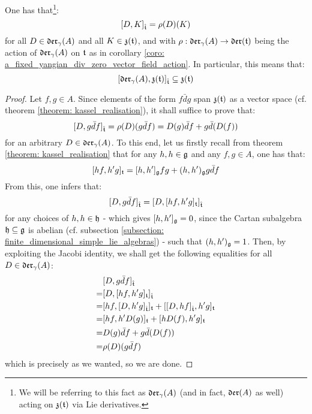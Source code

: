         \begin{lemma} \label{lemma: derivation_action_on_toroidal_centres}
            One has that\footnote{We will be referring to this fact as $\mathfrak{der}_{\gamma}(A)$ (and in fact, $\mathfrak{der}(A)$ as well) acting on $\mathfrak{z}(\mathfrak{t})$ via Lie derivatives.}:
                $$[D, K]_{\hat{\mathfrak{t}}} = \rho(D)(K)$$
            for all $D \in \mathfrak{der}_{\gamma}(A)$ and all $K \in \mathfrak{z}(\mathfrak{t})$, and with $\rho: \mathfrak{der}_{\gamma}(A) \to \mathfrak{der}(\mathfrak{t})$ being the action of $\mathfrak{der}_{\gamma}(A)$ on $\mathfrak{t}$ as in corollary \ref{coro: a_fixed_yangian_div_zero_vector_field_action}. In particular, this means that:
                $$[\mathfrak{der}_{\gamma}(A), \mathfrak{z}(\mathfrak{t})]_{\hat{\mathfrak{t}}} \subseteq \mathfrak{z}(\mathfrak{t})$$
        \end{lemma}
            \begin{proof}
                Let $f, g \in A$. Since elements of the form $f \bar{d}g$ span $\mathfrak{z}(\mathfrak{t})$ as a vector space (cf. theorem \ref{theorem: kassel_realisation}), it shall suffice to prove that:
                    $$[D, g \bar{d}f]_{\hat{\mathfrak{t}}} = \rho(D)( g\bar{d}f ) = D(g) \bar{d}f + g \bar{d}(D(f))$$
                for an arbitrary $D \in \mathfrak{der}_{\gamma}(A)$. To this end, let us firstly recall from theorem \ref{theorem: kassel_realisation} that for any $h, h \in \mathfrak{g}$ and any $f, g \in A$, one has that:
                    $$[h f, h' g]_{\mathfrak{t}} = [h, h']_{\mathfrak{g}} fg + (h, h')_{\mathfrak{g}} g \bar{d}f$$
                From this, one infers that:
                    $$[D, g \bar{d}f]_{\hat{\mathfrak{t}}} = [ D, [hf, h' g]_{\mathfrak{t}} ]_{\hat{\mathfrak{t}}}$$
                for any choices of $h, h \in \mathfrak{h}$ - which gives $[h, h']_{\mathfrak{g}} = 0$, since the Cartan subalgebra $\mathfrak{h} \subseteq \mathfrak{g}$ is abelian (cf. subsection \ref{subsection: finite_dimensional_simple_lie_algebras}) - such that $(h, h')_{\mathfrak{g}} = 1$. Then, by exploiting the Jacobi identity, we shall get the following equalities for all $D \in \mathfrak{der}_{\gamma}(A)$:
                    $$
                        \begin{aligned}
                            & [D, g \bar{d}f]_{\hat{\mathfrak{t}}}
                            \\
                            = & [ D, [h f, h' g]_{\mathfrak{t}} ]_{\hat{\mathfrak{t}}}
                            \\
                            = & [ h f, [D, h' g]_{\hat{\mathfrak{t}}} ]_{\mathfrak{t}} + [ [D, h f]_{\hat{\mathfrak{t}}}, h' g ]_{\mathfrak{t}}
                            \\
                            = & [ h f, h' D( g ) ]_{\mathfrak{t}} + [ h D( f ), h' g ]_{\mathfrak{t}}
                            \\
                            = & D(g) \bar{d}f + g \bar{d}(D(f))
                            \\
                            = & \rho(D)( g \bar{d}f )
                        \end{aligned}
                    $$
                which is precisely as we wanted, so we are done. 
            \end{proof}
